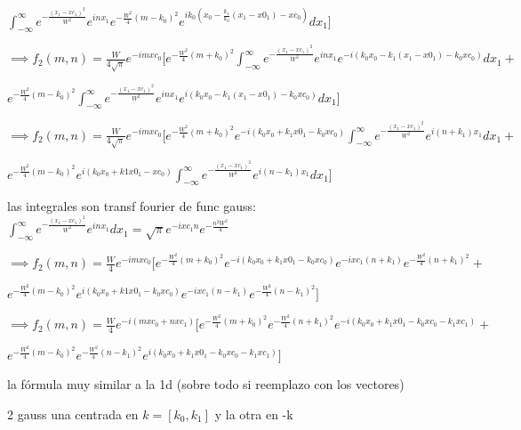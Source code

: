 \documentclass{article}
\begin{document}
\begin{description}
$   \int_{- \infty}^{\infty}{e^{- \frac{(x_1-xc_1)^2}{W^2}} 
e^{i n x_1}  e^{-\frac{W^2}{4}  (m-k_0)^2} e^{i  k_0 (x_0 - \frac{k_1}{k_0}(x_1 - x0_1) -xc_0)} dx_1 }\big] $


\item $\implies f_2(m,n) = \frac{W}{4 \sqrt{\pi}}  e^{-i  m  xc_0} \big[  e^{-\frac{W^2}{4}  (m+k_0)^2} 
\int_{- \infty}^{\infty}{e^{- \frac{(x_1-xc_1)^2}{W^2}} 
e^{i n x_1} e^{-i  (k_0 x_0 - k_1 (x_1 - x0_1) - k_0 xc_0)} dx_1}  + $ 

$  e^{-\frac{W^2}{4}  (m-k_0)^2}   \int_{- \infty}^{\infty}{e^{- \frac{(x_1-xc_1)^2}{W^2}} 
e^{i n x_1}  e^{i  (k_0 x_0 -k_1(x_1 - x0_1) -k_0 xc_0)} dx_1 }\big] $

\item $\implies f_2(m,n) = \frac{W}{4 \sqrt{\pi}}  e^{-i  m  xc_0} \big[  e^{-\frac{W^2}{4} (m+k_0)^2} e^{-i  (k_0 x_0 + k_1 x0_1 - k_0 xc_0)}  
\int_{- \infty}^{\infty}{e^{- \frac{(x_1-xc_1)^2}{W^2}} 
e^{i (n +k_1) x_1}  dx_1}  + $ 

$  e^{-\frac{W^2}{4}  (m-k_0)^2}  e^{i  (k_0 x_0 + k1 x0_1 -xc_0)}   \int_{- \infty}^{\infty}{e^{- \frac{(x_1-xc_1)^2}{W^2}} 
e^{i (n-k_1) x_1}  dx_1 }\big] $
\item las integrales son transf fourier de func gauss:
$\int_{- \infty}^{\infty}{e^{- \frac{(x_1-xc_1)^2}{W^2}} 
e^{i n x_1}  dx_1 }  = \sqrt{\pi} e^{-i xc_1 n } e^{-\frac{n^2 W^2}{4}} $

\item $\implies f_2(m,n) = \frac{W}{4}  e^{-i  m  xc_0} \big[  e^{-\frac{W^2}{4} (m+k_0)^2} e^{-i  (k_0 x_0 + k_1 x0_1 - k_0 xc_0)}  
e^{-i xc_1 (n+k_1) } e^{-\frac{W^2}{4}(n+k_1)^2} + $

$  e^{-\frac{W^2}{4}  (m-k_0)^2}  e^{i  (k_0 x_0 + k1 x0_1 -k_0 xc_0)}  e^{-i xc_1 (n-k_1) } e^{-\frac{W^2}{4}(n-k_1)^2}  \big] $

\item $\implies f_2(m,n) = \frac{W}{4} e^{-i  (m  xc_0 + n xc_1)}  \big[  e^{-\frac{W^2}{4} (m+k_0)^2}   
e^{-\frac{W^2}{4}(n+k_1)^2} e^{-i  (k_0 x_0 + k_1 x0_1 - k_0 xc_0 - k_1 xc_1)}+ $

$  e^{-\frac{W^2}{4}  (m-k_0)^2}   e^{-\frac{W^2}{4}(n-k_1)^2} e^{i  (k_0 x_0 + k_1 x0_1 - k_0 xc_0 - k_1 xc_1)} \big] $

\item la fórmula muy similar a la 1d (sobre todo si reemplazo con los vectores)
\item 2 gauss una centrada en $k=[k_0,k_1]$ y la otra en -k
\end{description}
\end{document}
